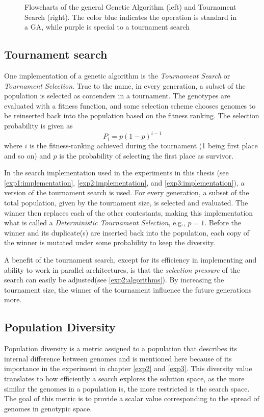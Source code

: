 \begin{figure}[h]
\begin{subfigure}[h]{0.25\linewidth}
    \end{subfigure}
    \caption[Algorithm flowcharts]{Flowcharts of the general Genetic Algorithm (left) and Tournament Search (right). The color blue indicates the operation is standard in a GA, while purple is special to a tournament search}
    \label{fig:algorithmflowcharts}
\end{figure}

\subsection{Tournament search}
One implementation of a genetic algorithm is the \textit{Tournament Search} or \textit{Tournament Selection}. True to the name, in every generation, a subset of the population is selected as contenders in a tournament. The genotypes are evaluated with a fitness function, and some selection scheme chooses genomes to be reinserted back into the population based on the fitness ranking. The selection probability is given as 
\begin{equation}
    \label{eq:tournamentsearch}
    P_{i} = p(1-p)^{i-1}
\end{equation}
where \(i\) is the fitness-ranking achieved during the tournament (1 being first place and so on) and \(p\) is the probability of selecting the first place as survivor.  

In the search implementation used in the experiments in this thesis (see \ref{exp1:implementation}, \ref{exp2:implementation}, and \ref{exp3:implementation}), a version of the tournament search is used. For every generation, a subset of the total population, given by the tournament size, is selected and evaluated. The winner then replaces each of the other contestants, making this implementation what is called a \textit{Deterministic Tournament Selection}, e.g., \(p=1\). Before the winner and its duplicate(s) are inserted back into the population, each copy of the winner is mutated under some probability to keep the diversity. 

A benefit of the tournament search, except for its efficiency in implementing and ability to work in parallel architectures, is that the \textit{selection pressure} of the search can easily be adjusted(see \ref{exp2:algorithms}). By increasing the tournament size, the winner of the tournament influence the future generations more.

\subsection{Population Diversity}
\label{background:diversity}
Population diversity is a metric assigned to a population that describes its internal difference between genomes and is mentioned here because of its importance in the experiment in chapter \ref{exp2} and \ref{exp3}. This diversity value translates to how efficiently a search explores the solution space, as the more similar the genomes in a population is, the more restricted is the search space. The goal of this metric is to provide a scalar value corresponding to the spread of genomes in genotypic space. 

